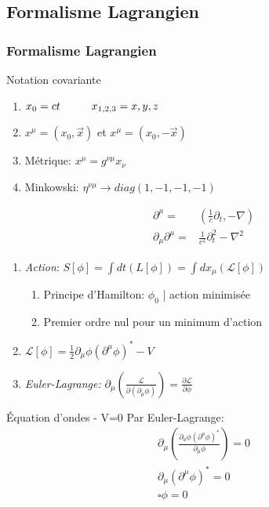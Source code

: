 \documentclass[handout]{beamer}
\begin{document}
\subsection{Formalisme Lagrangien}
\begin{frame}

\frametitle{Formalisme Lagrangien}

\begin{block}{Notation covariante}

\begin{enumerate}
\item $x_0 = ct \hspace{1 cm} x_{1,2,3} = x,y,z$
\item $x^\mu = (x_0,\vec{x})$ et $x^\mu = (x_0,-\vec{x})$
\item Métrique: $x^\mu = g^{\nu\mu} x_\nu$
\item Minkowski: $\eta^{\nu\mu} \rightarrow diag(1,-1,-1,-1)$
\end{enumerate}

\end{block}
\begin{align*}
\partial^\mu =& (\frac{1}{c} \partial_t, -\nabla) \\
\partial_\mu \partial^\mu =& \frac{1}{c^2} \partial_t^2- \nabla^2
\end{align*}
\end{frame}

\begin{frame}
\begin{enumerate}
\item \textit{Action}: $S[\phi] = \int{dt (L[\phi])}  =  \int{dx_\mu (\mathcal{L}[\phi])}$
\begin{enumerate}
\item Principe d'Hamilton: $\phi_0$ | action minimisée \\
\item Premier ordre nul pour un minimum d'action \\
\end{enumerate}
\item  $\mathcal{L}[\phi] = \frac{1}{2} \partial_\mu \phi (\partial^\mu \phi)^* -V$
\item \textit{Euler-Lagrange:} $\partial_\mu \left(\frac{\mathcal{L}}{\partial(\partial_\mu\phi)}\right) = \frac{\partial\mathcal{L}}{\partial\phi}$
\end{enumerate}
\begin{exampleblock}{Équation d'ondes - V=0}
Par Euler-Lagrange:
\begin{align*}
 \partial_\mu(\frac{\partial_a\phi (\partial^a\phi)^* }{\partial_\mu \phi}) = 0 \\
\partial_\mu (\partial^\mu \phi)^*  = 0 \\
 \square \phi = 0 \\
\end{align*}

\end{exampleblock}

\end{frame}
\end{document}
